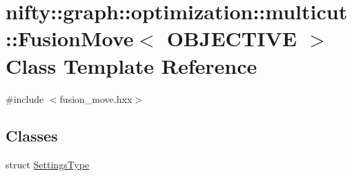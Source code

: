 \hypertarget{classnifty_1_1graph_1_1optimization_1_1multicut_1_1FusionMove}{}\section{nifty\+:\+:graph\+:\+:optimization\+:\+:multicut\+:\+:Fusion\+Move$<$ O\+B\+J\+E\+C\+T\+I\+V\+E $>$ Class Template Reference}
\label{classnifty_1_1graph_1_1optimization_1_1multicut_1_1FusionMove}


{\ttfamily \#include $<$fusion\+\_\+move.\+hxx$>$}

\subsection*{Classes}
\begin{DoxyCompactItemize}
\item 
struct \hyperlink{structnifty_1_1graph_1_1optimization_1_1multicut_1_1FusionMove_1_1SettingsType}{Settings\+Type}
\end{DoxyCompactItemize}
